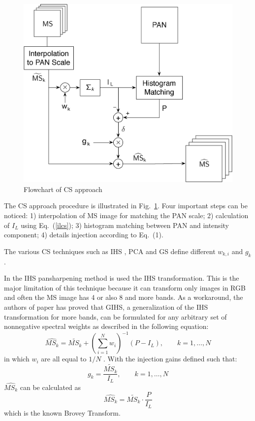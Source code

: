 \documentclass[12pt]{report}
\begin{document}
\begin{figure}[t!]
\centering
\includegraphics[width=\textwidth]{cs.png}
\caption{Flowchart of CS approach \cite{criticalComparison}}
\label{fig:csapproach}
\end{figure}


The CS approach procedure is illustrated in  Fig.~\ref{fig:csapproach}. Four important steps can be noticed: 
1) interpolation of MS image for matching the PAN scale; 2) calculation of $I_L$ using Eq.~(\ref{ilcs}); 3) histogram matching between PAN and intensity component; 4) details injection according to Eq.~(1).

The various CS techniques such as IHS \cite{ihs1,ihs2}, PCA \cite{pca2,changedetection} and GS \cite{gs,cs3} define different $w_{k,i}$ and $g_k$.

In the IHS pansharpening method is used the IHS transformation. This is the major limitation of this technique because it can transform only images in RGB and often the MS image has 4 or also 8 and more bands. As a workaround, the authors of paper \cite{cs6} has proved that GIHS, a generalization of the IHS transformation for more bands, can be formulated for any arbitrary set of nonnegative spectral weights as described in the following equation: 
%
\begin{equation}
    \widehat{MS_k} = \widetilde{MS_k} + \left(\sum_{i=1}^{N}w_i\right)^{-1}(P - I_L), \qquad 
    k = 1,\dots,N
    \label{cs2}
\end{equation}
%
in which $w_i$ are all equal to $1/N$ \cite{ihs1}.
With the injection gains defined such that:
\begin{equation}
    g_k = \frac{\widetilde{MS_k}}{I_L}, \qquad k = 1,\dots,N
    \label{csgk}
\end{equation}
%
$\widehat{MS_k}$ can be calculated as 
\begin{equation}
    \widehat{MS_k} = \widetilde{MS_k} \cdot \frac{P}{I_L}
    \label{csfinal}
\end{equation}
%
which is the known Brovey Transform. 
\end{document}
